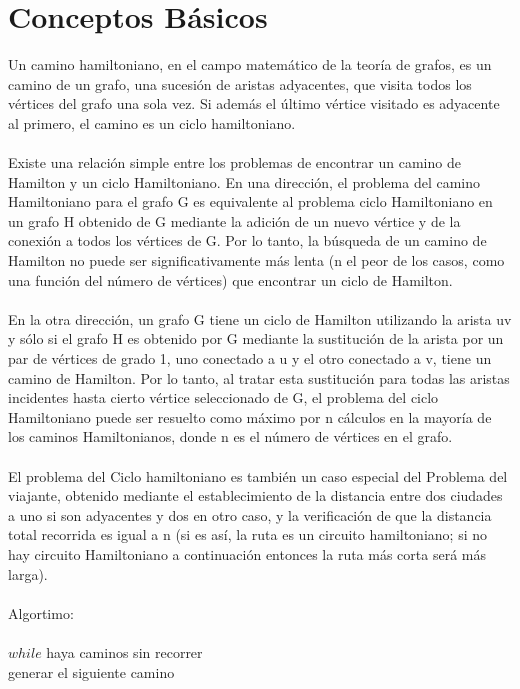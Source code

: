 \documentclass[12pt,twoside]{article}
\begin{document}
\section{Conceptos B\'asicos}
Un camino hamiltoniano, en el campo matemático de la teoría de grafos, es un camino de un grafo, una sucesión de aristas adyacentes, que visita todos los vértices del grafo una sola vez. Si además el último vértice visitado es adyacente al primero, el camino es un ciclo hamiltoniano.\\\\
Existe una relación simple entre los problemas de encontrar un camino de Hamilton y un ciclo Hamiltoniano. En una dirección, el problema del camino Hamiltoniano para el grafo G es equivalente al problema ciclo Hamiltoniano en un grafo H obtenido de G mediante la adición de un nuevo vértice y de la conexión a todos los vértices de G. Por lo tanto, la búsqueda de un camino de Hamilton no puede ser significativamente más lenta (n el peor de los casos, como una función del número de vértices) que encontrar un ciclo de Hamilton.\\\\
En la otra dirección, un grafo G tiene un ciclo de Hamilton utilizando la arista uv y sólo si el grafo H es obtenido por G mediante la sustitución de la arista por un par de vértices de grado 1, uno conectado a u y el otro conectado a v, tiene un camino de Hamilton. Por lo tanto, al tratar esta sustitución para todas las aristas incidentes hasta cierto vértice seleccionado de G, el problema del ciclo Hamiltoniano puede ser resuelto como máximo por n cálculos en la mayoría de los caminos Hamiltonianos, donde n es el número de vértices en el grafo.\\\\
El problema del Ciclo hamiltoniano es también un caso especial del Problema del viajante, obtenido mediante el establecimiento de la distancia entre dos ciudades a uno si son adyacentes y dos en otro caso, y la verificación de que la distancia total recorrida es igual a n (si es así, la ruta es un circuito hamiltoniano; si no hay circuito Hamiltoniano a continuación entonces la ruta más corta será más larga).\\\\
Algortimo:\\\\
\hspace*{1cm}$while$ haya caminos sin recorrer\\
\hspace*{2cm}generar el siguiente camino\\
\end{document}

